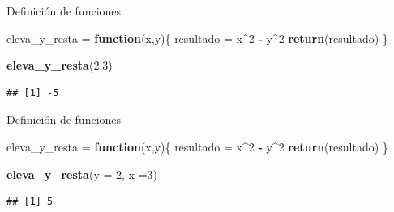 \documentclass[ignorenonframetext,]{beamer}
\newenvironment{Shaded}{\begin{snugshade}}{\end{snugshade}}
\newcommand{\ControlFlowTok}[1]{\textcolor[rgb]{0.13,0.29,0.53}{\textbf{#1}}}
\newcommand{\DataTypeTok}[1]{\textcolor[rgb]{0.13,0.29,0.53}{#1}}
\newcommand{\DecValTok}[1]{\textcolor[rgb]{0.00,0.00,0.81}{#1}}
\newcommand{\KeywordTok}[1]{\textcolor[rgb]{0.13,0.29,0.53}{\textbf{#1}}}
\newcommand{\NormalTok}[1]{#1}
\newcommand{\OperatorTok}[1]{\textcolor[rgb]{0.81,0.36,0.00}{\textbf{#1}}}
\newcommand{\StringTok}[1]{\textcolor[rgb]{0.31,0.60,0.02}{#1}}
\begin{document}
\begin{frame}[fragile]{Definición de funciones}
\protect\hypertarget{definiciuxf3n-de-funciones-2}{}

\begin{Shaded}
\begin{Highlighting}[]
\NormalTok{eleva_y_resta =}\StringTok{ }\ControlFlowTok{function}\NormalTok{(x,y)\{}
\NormalTok{  resultado =}\StringTok{ }\NormalTok{x}\OperatorTok{^}\DecValTok{2} \OperatorTok{-}\StringTok{ }\NormalTok{y}\OperatorTok{^}\DecValTok{2}
  \KeywordTok{return}\NormalTok{(resultado)}
\NormalTok{\}}

\KeywordTok{eleva_y_resta}\NormalTok{(}\DecValTok{2}\NormalTok{,}\DecValTok{3}\NormalTok{)}
\end{Highlighting}
\end{Shaded}

\begin{verbatim}
## [1] -5
\end{verbatim}

\end{frame}

\begin{frame}[fragile]{Definición de funciones}
\protect\hypertarget{definiciuxf3n-de-funciones-3}{}

\begin{Shaded}
\begin{Highlighting}[]
\NormalTok{eleva_y_resta =}\StringTok{ }\ControlFlowTok{function}\NormalTok{(x,y)\{}
\NormalTok{  resultado =}\StringTok{ }\NormalTok{x}\OperatorTok{^}\DecValTok{2} \OperatorTok{-}\StringTok{ }\NormalTok{y}\OperatorTok{^}\DecValTok{2}
  \KeywordTok{return}\NormalTok{(resultado)}
\NormalTok{\}}

\KeywordTok{eleva_y_resta}\NormalTok{(}\DataTypeTok{y =} \DecValTok{2}\NormalTok{, }\DataTypeTok{x =}\DecValTok{3}\NormalTok{)}
\end{Highlighting}
\end{Shaded}

\begin{verbatim}
## [1] 5
\end{verbatim}

\end{frame}
\end{document}
